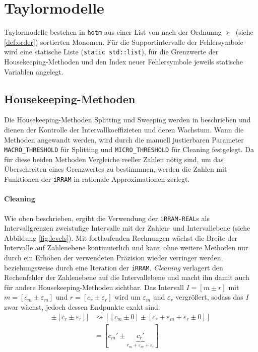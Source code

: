 \section{Taylormodelle}
Taylormodelle bestehen in \verb+hotm+ aus einer List von nach der Ordnunng $\succ$ (siehe \ref{def:order}) sortierten Monomen. Für die Supportintervalle der Fehlersymbole wird eine statische Liste (\verb+static std::list+), für die Grenzwerte der Housekeeping-Methoden und den Index neuer Fehlersymbole jeweils statische Variablen angelegt.
\subsection{Housekeeping-Methoden}
Die Housekeeping-Methoden Splitting und Sweeping werden in \cite{DBLP:conf/macis/BrausseKM15} beschrieben und dienen der Kontrolle der Intervallkoeffizieten und deren Wachstum. Wann die Methoden angewandt werden, wird durch die manuell justierbaren Parameter \verb+MACRO_THRESHOLD+ für Splitting und \verb+MICRO_THRESHOLD+ für Cleaning festgelegt. Da für diese beiden Methoden Vergleiche reeller Zahlen nötig sind, um das Überschreiten eines Grenzwertes zu bestimmnen, werden die Zahlen mit Funktionen der \verb+iRRAM+ in rationale Approximationen zerlegt.

\paragraph{Cleaning}
\label{par:cleaning}
Wie oben beschrieben, ergibt die Verwendung der \verb+iRRAM-REAL+s als Intervallgrenzen zweistufige Intervalle mit der Zahlen- und Intervallebene (siehe Abbildung \ref{fig:levels}). Mit fortlaufenden Rechnungen wächst die Breite der Intervalle auf Zahlenebene kontinuierlich und kann ohne weitere Methoden nur durch ein Erhöhen der verwendeten Präzision wieder verringer werden, beziehungsweise durch eine Iteration der \verb+iRRAM+. \textit{Cleaning} verlagert den Rechenfehler der Zahlenebene auf die Intervallebene und macht ihn damit auch für andere Housekeeping-Methoden sichtbar. Das Intervall $I=[m \pm r]$ mit $m=[c_m \pm \varepsilon_m]$ und $r = [c_r \pm \varepsilon_r]$ wird um $\varepsilon_m$ und $\varepsilon_r$ vergrößert, sodass das $I$ zwar wächst, jedoch dessen Endpunkte exakt sind:
\begin{align*}[[c_m \pm \varepsilon_m] \pm [c_r \pm \varepsilon_r]] &\rightsquigarrow [[c_m \pm 0] \pm [c_r + \varepsilon_m +\varepsilon_r  \pm 0]] \\
&= [c_m' \pm \underbrace{c_r'}_{c_m + \varepsilon_m +\varepsilon_r}  ]\end{align*}


